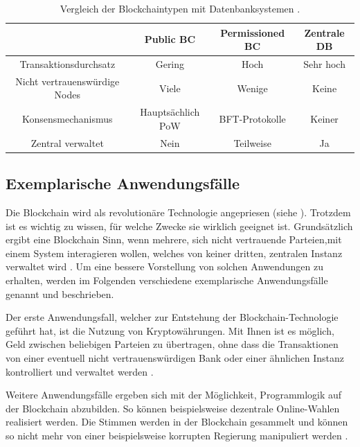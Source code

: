 \begin{table}[h]
    \centering
	\begin{tabular}{c c c c}
	\textbf{} & \textbf{Public \acs{BC}} & \textbf{Permissioned \acs{BC}}  & \textbf{Zentrale DB} \\ \hline
	Transaktionsdurchsatz & Gering & Hoch & Sehr hoch \\ \hline
    Nicht vertrauenswürdige Nodes & Viele & Wenige & Keine \\ \hline
    Konsensmechanismus & Hauptsächlich \acs{PoW} & \acs{BFT}-Protokolle & Keiner \\ \hline
    Zentral verwaltet & Nein & Teilweise & Ja \\
    \end{tabular}
    \caption{Vergleich der Blockchaintypen mit Datenbanksystemen \cite{WustyouneedBlockchain2017}\cite{ZhengBlockchainChallengesOpportunities2017}.}
	\label{tab:bc-comparison}
\end{table}

\subsection{Exemplarische Anwendungsfälle}
\label{subsec:use-cases}
Die Blockchain wird als revolutionäre Technologie angepriesen (siehe \cite{TapscottBlockchainRevolutionWieTechnologie2016}). Trotzdem ist es wichtig zu wissen, für welche Zwecke sie wirklich geeignet ist. Grundsätzlich ergibt eine Blockchain Sinn, wenn mehrere, sich nicht vertrauende Parteien,mit einem System interagieren wollen, welches von keiner dritten, zentralen Instanz verwaltet wird \cite{WustyouneedBlockchain2017}. Um eine bessere Vorstellung von solchen Anwendungen zu erhalten, werden im Folgenden verschiedene exemplarische Anwendungsfälle genannt und beschrieben.

Der erste Anwendungsfall, welcher zur Entstehung der Blockchain-Technologie geführt hat, ist die Nutzung von Kryptowährungen. Mit Ihnen ist es möglich, Geld zwischen beliebigen Parteien zu übertragen, ohne dass die Transaktionen von einer eventuell nicht vertrauenswürdigen Bank oder einer ähnlichen Instanz kontrolliert und verwaltet werden \cite[S.~\Rn{10}]{SwanBlockchainblueprintnew2015}.

Weitere Anwendungsfälle ergeben sich mit der Möglichkeit, Programmlogik auf der Blockchain abzubilden. So können beispielsweise dezentrale Online-Wahlen realisiert werden. Die Stimmen werden in der Blockchain gesammelt und können so nicht mehr von einer beispielsweise korrupten Regierung manipuliert werden \cite{CastorEthereumVotingScheme2017}.

